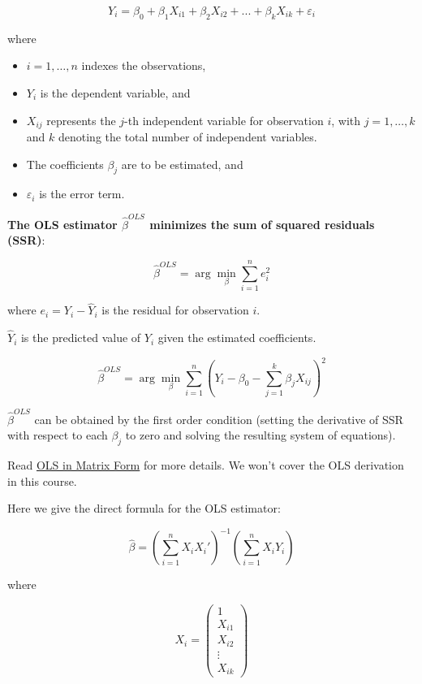 \documentclass[
  12pt,
  letterpaper,
]{scrbook}
\providecommand{\tightlist}{%
  \setlength{\itemsep}{0pt}\setlength{\parskip}{0pt}}
\renewcommand{\tightlist}{\setlength{\itemsep}{0.5\baselineskip}\setlength{\parskip}{0.2\baselineskip}}
\theoremstyle{plain}
\theoremstyle{definition}
\theoremstyle{remark}
\begin{document}
\[
Y_i = \beta_0 + \beta_1 X_{i1} + \beta_2 X_{i2} + ... + \beta_k X_{ik} + \varepsilon_i
\]

where

\begin{itemize}
\tightlist
\item
  \(i=1,\ldots, n\) indexes the observations,
\item
  \(Y_i\) is the dependent variable, and
\item
  \(X_{ij}\) represents the \(j\)-th independent variable for
  observation \(i\), with \(j = 1, \ldots, k\) and \(k\) denoting the
  total number of independent variables.
\item
  The coefficients \(\beta_j\) are to be estimated, and
\item
  \(\varepsilon_i\) is the error term.
\end{itemize}

\textbf{The OLS estimator \(\hat{\beta}^{OLS}\) minimizes the sum of
squared residuals (SSR)}:

\[
\hat{\beta}^{OLS} = \arg\min_{\beta} \sum_{i=1}^{n} e_i^2 
\]

where \(e_i = Y_i - \hat{Y}_i\) is the residual for observation \(i\).

\(\hat{Y}_i\) is the predicted value of \(Y_i\) given the estimated
coefficients.

\[
\hat{\beta}^{OLS} = \arg\min_{\beta} \sum_{i=1}^{n} (Y_i - \beta_0 - \sum_{j=1}^{k} \beta_j X_{ij})^2
\]

\(\hat{\beta}^{OLS}\) can be obtained by the first order condition
(setting the derivative of SSR with respect to each \(\beta_j\) to zero
and solving the resulting system of equations).

Read
\href{https://github.com/my1396/FIN5005-Fall2024/blob/a4ec0c87c6bcbd463b4da1ad78878b1fe329cda4/images/matrix_OLS_NYU_notes.pdf}{OLS
in Matrix Form} for more details. We won't cover the OLS derivation in
this course.

Here we give the direct formula for the OLS estimator:

\[
\hat\beta = \left(\sum_{i=1}^n X_iX_i'\right)^{-1} \left(\sum_{i=1}^n X_iY_i\right)
\]

where

\[
X_i = \begin{pmatrix}1 \\ X_{i1} \\ X_{i2} \\ \vdots \\ X_{ik}\end{pmatrix}
\]
\end{document}

